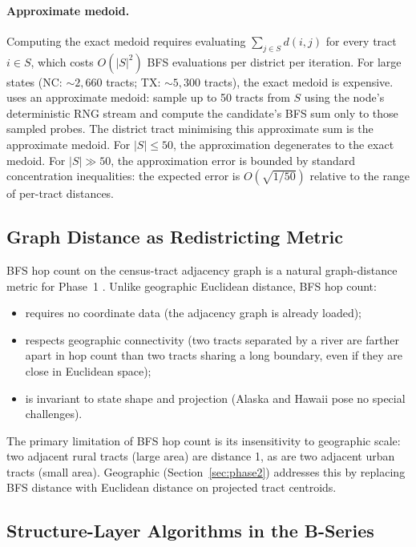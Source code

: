 \paragraph{Approximate medoid.}
Computing the exact medoid requires evaluating $\sum_{j \in S} d(i,j)$
for every tract $i \in S$, which costs $O(|S|^2)$ BFS evaluations per
district per iteration.
For large states (NC: $\sim 2{,}660$ tracts; TX: $\sim 5{,}300$ tracts),
the exact medoid is expensive.
\cvd{} uses an approximate medoid: sample up to 50 tracts from $S$ using the
node's deterministic RNG stream and compute the candidate's BFS sum only to
those sampled probes.
The district tract minimising this approximate sum is the approximate medoid.
For $|S| \le 50$, the approximation degenerates to the exact medoid.
For $|S| \gg 50$, the approximation error is bounded by standard
concentration inequalities: the expected error is $O(\sqrt{1/50})$ relative
to the range of per-tract distances.

\subsection{Graph Distance as Redistricting Metric}

BFS hop count on the census-tract adjacency graph is a natural graph-distance
metric for Phase~1 \cvd{}.
Unlike geographic Euclidean distance, BFS hop count:
\begin{itemize}
\item requires no coordinate data (the adjacency graph is already loaded);
\item respects geographic connectivity (two tracts separated by a river
  are farther apart in hop count than two tracts sharing a long boundary,
  even if they are close in Euclidean space);
\item is invariant to state shape and projection (Alaska and Hawaii pose
  no special challenges).
\end{itemize}
The primary limitation of BFS hop count is its insensitivity to geographic
scale: two adjacent rural tracts (large area) are distance 1, as are two
adjacent urban tracts (small area).
Geographic \cvd{} (Section~\ref{sec:phase2}) addresses this by
replacing BFS distance with Euclidean distance on projected tract centroids.

\subsection{Structure-Layer Algorithms in the B-Series}


